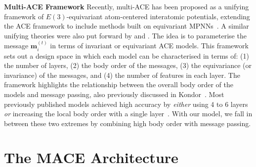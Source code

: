 \documentclass{article}
\newcommand*\compactparagraph[1]{\textbf{#1} \quad}
\begin{document}
\compactparagraph{Multi-ACE Framework}
Recently, multi-ACE has been proposed as a unifying framework of $E(3)$-equivariant atom-centered interatomic potentials, extending the ACE framework to include methods built on equivariant MPNNs~\cite{botnet}.
A similar unifying theories were also put forward by \cite{nigam2022unified} and \cite{Bochkarev_2022}.
The idea is to parameterise the message ${\bm m}_i^{(t)}$ in terms of invariant or equivariant ACE models. This framework sets out a design space in which each model can be characterised in terms of:
(1) the number of layers,
(2) the body order of the messages,
(3) the equivariance (or invariance) of the messages, and
(4) the number of features in each layer.
The framework highlights the relationship between the overall body order of the models and message passing, also previously discussed in Kondor~\cite{kondor2018N_bodyNets}.
Most previously published models achieved high accuracy by \textit{either} using 4 to 6 layers~\cite{nequip, Schutt2021PaiNN} \textit{or} increasing the local body order with a single layer~\cite{kovacs2021, Allegro2022}.
With our model, we fall in between these two extremes by combining high body order with message passing.

\section{The MACE Architecture}
\label{sec:architecture}
\end{document}
